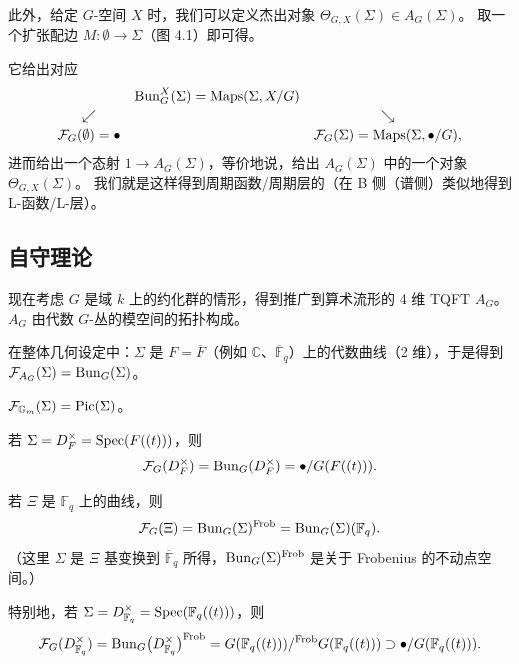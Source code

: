 此外，给定 $G$-空间 $X$ 时，我们可以定义杰出对象 $\Theta_{G,X}(\Sigma)\in A_G(\Sigma)$。
取一个扩张配边 $M:\emptyset\to\Sigma$（图 4.1）即可得。


它给出对应
\[
\begin{array}{ccc}
& \operatorname{Bun}^X_G(\Sigma)=\operatorname{Maps}(\Sigma,X/G) &\\[2pt]
\swarrow & & \searrow\\[2pt]
\mathcal F_G(\emptyset)=\bullet & & \mathcal F_G(\Sigma)=\operatorname{Maps}(\Sigma,\bullet/G),
\end{array}
\]
进而给出一个态射 $1\to A_G(\Sigma)$，等价地说，给出 $A_G(\Sigma)$ 中的一个对象 $\Theta_{G,X}(\Sigma)$。
我们就是这样得到周期函数/周期层的（在 B 侧（谱侧）类似地得到 L-函数/L-层）。

\subsection{自守理论}
现在考虑 $G$ 是域 $k$ 上的约化群的情形，得到推广到算术流形的 4 维 TQFT $A_G$。
$A_G$ 由代数 $G$-丛的模空间的拓扑构成。

在整体几何设定中：$\Sigma$ 是 $F=\overline F$（例如 $\mathbb C$、$\overline{\mathbb F}_q$）上的代数曲线（2 维），于是得到 $\mathcal F_{A_G}(\Sigma)=\operatorname{Bun}_G(\Sigma)$。

\begin{exmp}
$\mathcal F_{\mathbb G_m}(\Sigma)=\operatorname{Pic}(\Sigma)$。
\end{exmp}

\begin{exmp}
若 $\Sigma=D^\times_F=\operatorname{Spec}(F((t)))$，则
\[
  \mathcal F_G(D^\times_F)=\operatorname{Bun}_G(D^\times_F)=\bullet/G(F((t))).
\]
\end{exmp}

\begin{exmp}
若 $\Xi$ 是 $\mathbb F_q$ 上的曲线，则
\[
  \mathcal F_G(\Xi)=\operatorname{Bun}_G(\Sigma)^{\operatorname{Frob}}=\operatorname{Bun}_G(\Sigma)(\mathbb F_q).
\]
（这里 $\Sigma$ 是 $\Xi$ 基变换到 $\overline{\mathbb F}_q$ 所得，$\operatorname{Bun}_G(\Sigma)^{\operatorname{Frob}}$ 是关于 Frobenius 的不动点空间。）
\end{exmp}

\begin{exmp}
特别地，若 $\Sigma=D^\times_{\mathbb F_q}=\operatorname{Spec}(\mathbb F_q((t)))$，则
\[
  \mathcal F_G(D^\times_{\mathbb F_q})=\operatorname{Bun}_G\bigl(D^\times_{\mathbb F_q}\bigr)^{\operatorname{Frob}}
  =G(\mathbb F_q((t)))/^{\operatorname{Frob}}G(\mathbb F_q((t)))\supset\bullet/G(\mathbb F_q((t))).
\]
\end{exmp}

